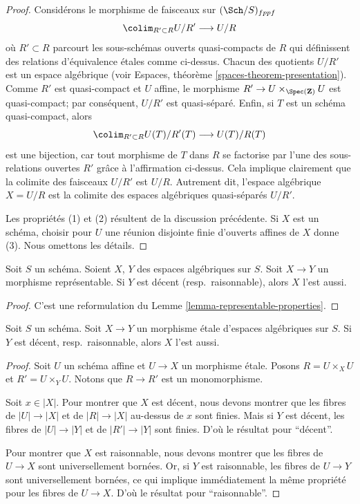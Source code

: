 \begin{proof}
\medskip\noindent
Considérons le morphisme de faisceaux sur $(\Sch/S)_{fppf}$
$$
\colim_{R' \subset R} U/R' \longrightarrow U/R
$$
où $R' \subset R$ parcourt les sous-schémas ouverts quasi-compacts de $R$
qui définissent des relations d'équivalence étales comme ci-dessus.
Chacun des quotients $U/R'$ est un espace algébrique
(voir Espaces, théorème \ref{spaces-theorem-presentation}).
Comme $R'$ est quasi-compact et $U$ affine, le morphisme
$R' \to U \times_{\Spec(\mathbf{Z})} U$ est quasi-compact;
par conséquent, $U/R'$ est quasi-séparé. Enfin, si $T$ est un schéma
quasi-compact, alors
$$
\colim_{R' \subset R} U(T)/R'(T) \longrightarrow U(T)/R(T)
$$
est une bijection, car tout morphisme de $T$ dans $R$ se factorise par l'une
des sous-relations ouvertes $R'$ grâce à l'affirmation ci-dessus. Cela
implique clairement que la colimite des faisceaux $U/R'$ est $U/R$. Autrement
dit, l'espace algébrique $X = U/R$ est la colimite des espaces algébriques
quasi-séparés $U/R'$.

\medskip\noindent
Les propriétés (1) et (2) résultent de la discussion précédente.
Si $X$ est un schéma, choisir pour $U$ une réunion disjointe finie d'ouverts
affines de $X$ donne (3).
Nous omettons les détails.
\end{proof}

\begin{lemma}
\label{lemma-representable-named-properties}
Soit $S$ un schéma. Soient $X$, $Y$ des espaces algébriques sur $S$.
Soit $X \to Y$ un morphisme représentable.
Si $Y$ est décent (resp.\ raisonnable), alors $X$ l'est aussi.
\end{lemma}

\begin{proof}
C'est une reformulation du Lemme \ref{lemma-representable-properties}.
\end{proof}

\begin{lemma}
\label{lemma-etale-named-properties}
Soit $S$ un schéma. Soit $X \to Y$ un morphisme étale d'espaces
algébriques sur $S$. Si $Y$ est décent, resp.\ raisonnable,
alors $X$ l'est aussi.
\end{lemma}

\begin{proof}
Soit $U$ un schéma affine et $U \to X$ un morphisme étale.
Posons $R = U \times_X U$ et $R' = U \times_Y U$. Notons que
$R \to R'$ est un monomorphisme.

\medskip\noindent
Soit $x \in |X|$. Pour montrer que $X$ est décent, nous devons montrer que
les fibres de $|U| \to |X|$ et de $|R| \to |X|$ au-dessus de $x$ sont finies.
Mais si $Y$ est décent, les fibres de $|U| \to |Y|$ et de
$|R'| \to |Y|$ sont finies. D'où le résultat pour ``décent''.

\medskip\noindent
Pour montrer que $X$ est raisonnable, nous devons montrer que les fibres de
$U \to X$ sont universellement bornées. Or, si $Y$ est raisonnable, les fibres
de $U \to Y$ sont universellement bornées, ce qui implique immédiatement la
même propriété pour les fibres de $U \to X$.
D'où le résultat pour ``raisonnable''.
\end{proof}







